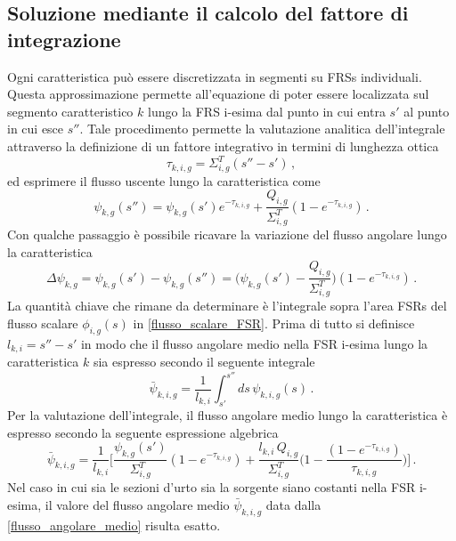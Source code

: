 \subsection{Soluzione mediante il calcolo del fattore di integrazione}
Ogni caratteristica può essere discretizzata in segmenti su FRSs individuali. 
Questa approssimazione permette all'equazione di poter essere localizzata sul 
segmento caratteristico $k$ lungo la FRS i-esima dal punto in cui entra $s'$ al 
punto in cui esce $s''$. Tale procedimento permette la valutazione analitica 
dell'integrale  attraverso la definizione di un fattore integrativo in termini 
di lunghezza ottica
\begin{equation}
\tau_{k,i,g}=\Sigma_{i,g}^T(s''-s') \,,
\end{equation}
ed esprimere il flusso uscente lungo la caratteristica come
\begin{equation}
\psi_{k,g}(s'')=\psi_{k,g}(s')e^{-\tau_{k,i,g}}+\frac{Q_{i,g}}{\Sigma_{i,g}^T}
(1-e^{-\tau_{k,i,g}}) \,.
\end{equation}
Con qualche passaggio è possibile ricavare la variazione del flusso angolare lungo la 
caratteristica 
\begin{equation}
\Delta\psi_{k,g}=\psi_{k,g}(s')-\psi_{k,g}(s'')=\biggl(\psi_{k,g}(s')-\frac{Q_{i
,g}}{\Sigma_{i,g}^T}\biggr)(1-e^{-\tau_{k,i,g}}) \,.
\end{equation}
La quantità chiave che rimane da determinare è l'integrale sopra l'area FSRs del 
flusso scalare $\phi_{i,g}(s)$ in \eqref{flusso_scalare_FSR}. Prima di tutto si 
definisce $l_{k,i}=s''-s'$ in modo che il flusso angolare medio nella FSR 
i-esima lungo la caratteristica $k$ sia espresso secondo il seguente integrale
\begin{equation}
\bar{\psi}_{k,i,g}=\frac{1}{l_{k,i}}\int_{s'}^{s''}ds\, \psi_{k,i,g}(s) \,.
\end{equation}
Per la valutazione dell'integrale, il flusso angolare medio lungo la 
caratteristica è espresso secondo la seguente espressione algebrica
\begin{equation}
\bar{\psi}_{k,i,g}=\frac{1}{l_{k,i}}\biggl[\frac{\psi_{k,g}(s')}{\Sigma_{i,g}^T}
(1-e^{-\tau_{k,i,g}})+\frac{l_{k,i}\,Q_{i,g}}{\Sigma_{i,g}^T}\biggl(1-\frac{
(1-e^{-\tau_{k,i,g}})}{\tau_{k,i,g}}\biggr)\biggr] \,.
\label{flusso_angolare_medio}
\end{equation}
Nel caso in cui sia le sezioni d'urto sia la sorgente siano costanti nella FSR 
i-esima, il valore del flusso angolare medio $\bar{\psi}_{k,i,g}$ data dalla 
\eqref{flusso_angolare_medio} risulta esatto.

